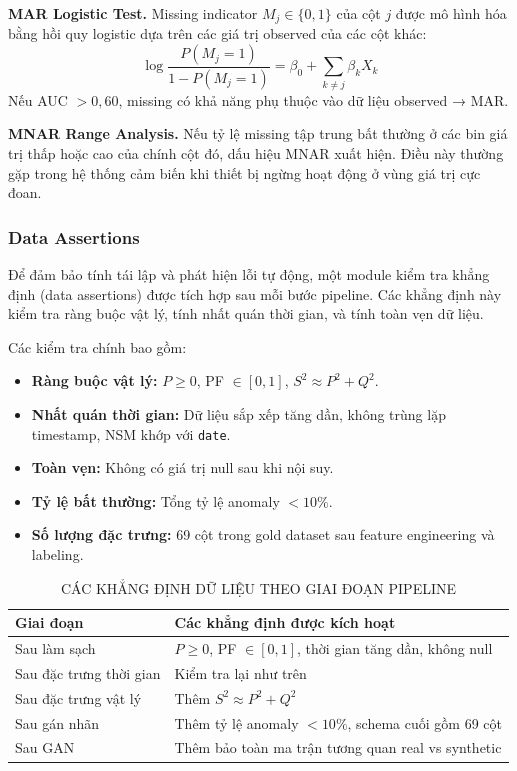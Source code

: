 \documentclass[conference]{IEEEtran}
\begin{document}
\textbf{MAR Logistic Test.}
Missing indicator $M_j \in \{0,1\}$ của cột $j$ được mô hình hóa bằng hồi quy logistic dựa trên các giá trị observed của các cột khác:
\begin{equation}
\log\frac{P(M_j=1)}{1-P(M_j=1)} = \beta_0 + \sum_{k \neq j} \beta_k X_k
\label{eq:mar}
\end{equation}
Nếu AUC $> 0{,}60$, missing có khả năng phụ thuộc vào dữ liệu observed → MAR.

\textbf{MNAR Range Analysis.}
Nếu tỷ lệ missing tập trung bất thường ở các bin giá trị thấp hoặc cao của chính cột đó, dấu hiệu MNAR xuất hiện.
Điều này thường gặp trong hệ thống cảm biến khi thiết bị ngừng hoạt động ở vùng giá trị cực đoan.

\subsubsection{Data Assertions}

Để đảm bảo tính tái lập và phát hiện lỗi tự động, một module kiểm tra khẳng định (data assertions) được tích hợp sau mỗi bước pipeline.
Các khẳng định này kiểm tra ràng buộc vật lý, tính nhất quán thời gian, và tính toàn vẹn dữ liệu.

Các kiểm tra chính bao gồm:
\begin{itemize}
    \item \textbf{Ràng buộc vật lý:} $P \ge 0$, PF $\in [0,1]$, $S^2 \approx P^2 + Q^2$.
    \item \textbf{Nhất quán thời gian:} Dữ liệu sắp xếp tăng dần, không trùng lặp timestamp, NSM khớp với \texttt{date}.
    \item \textbf{Toàn vẹn:} Không có giá trị null sau khi nội suy.
    \item \textbf{Tỷ lệ bất thường:} Tổng tỷ lệ anomaly $< 10\%$.
    \item \textbf{Số lượng đặc trưng:} 69 cột trong gold dataset sau feature engineering và labeling.
\end{itemize}

\begin{table}[htbp]
\caption{CÁC KHẲNG ĐỊNH DỮ LIỆU THEO GIAI ĐOẠN PIPELINE}
\label{tab:assertions}
\centering
\small
\begin{tabular}{@{}p{2.0cm}p{5.0cm}@{}}
\toprule
Giai đoạn & Các khẳng định được kích hoạt \\
\midrule
Sau làm sạch & $P \ge 0$, PF $\in [0,1]$, thời gian tăng dần, không null \\
Sau đặc trưng thời gian & Kiểm tra lại như trên \\
Sau đặc trưng vật lý & Thêm $S^2 \approx P^2 + Q^2$ \\
Sau gán nhãn & Thêm tỷ lệ anomaly $< 10\%$, schema cuối gồm 69 cột \\
Sau GAN & Thêm bảo toàn ma trận tương quan real vs synthetic \\
\bottomrule
\end{tabular}
\end{table}
\end{document}
